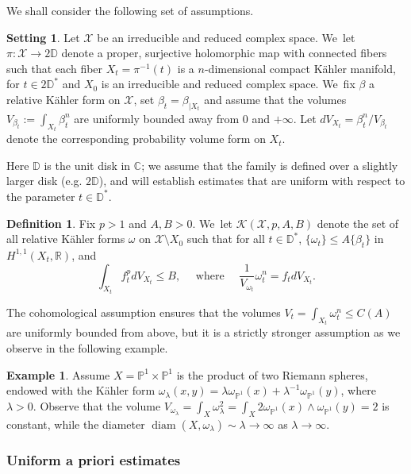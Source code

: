 \documentclass[JEP,XML,SOM,Unicode,published]{cedram}
\DeclareMathOperator{\diam}{diam}
\theoremstyle{definition}
\newtheorem{setting}[theorem]{Setting}
\newtheorem{defi}[theorem]{Definition}
\newtheorem{exa}[theorem]{Example}
\newcommand{\C}{\mathbb C}
\newcommand{\PP}{\mathbb P}
\newcommand{\R}{\mathbb R}
\begin{document}
We shall consider the following set of assumptions.

\begin{setting} \label{set}
Let $\mathcal{X}$ be an irreducible and reduced complex space. We~let $\pi:{\mathcal X} \rightarrow 2 \mathbb D$
denote a proper, surjective holomorphic map with connected fibers such that each fiber $X_t=\pi^{-1}(t)$ is a $n$-dimensional
compact Kähler manifold, for $t\in 2 \mathbb D^*$ and $X_0$ is an irreducible and reduced complex space. We~fix $\beta$ a relative Kähler form on $\mathcal{X}$, set $\beta_t=\beta_{|X_t}$ and assume that the volumes $V_{\beta_t}:=\int_{X_t} \beta_t^n$ are uniformly bounded away from 0 and $+ \infty $. Let $dV_{X_t}=\beta_t^n /V_{\beta_t}$ denote the corresponding probability volume form on $X_t$.
\end{setting}

Here $\mathbb D$ is the unit disk in $\C$; we assume that the family is defined over a slightly larger disk
(e.g. $2 \mathbb D$), and will establish estimates that are uniform with respect to the parameter $t \in \mathbb D^*$.

\begin{defi}
Fix $p>1$ and $A,B>0$. We~let ${\mathcal K}(\mathcal{X},p,A,B)$ denote the set of all relative Kähler forms $\omega$ on
$\mathcal{X}\setminus X_0$ such that for all $t \in \mathbb D^*$, $\{\omega_t\}\leq A\{\beta_t\}$ in $H^{1,1}(X_t,\R)$, and
\[
\int_{X_t} f_t^p dV_{X_t} \leq B,
\quad \text{ where } \quad
\frac{1}{V_{\omega_t}} \omega_t^n=f_t dV_{X_t}.
\]
\end{defi}

The cohomological assumption
ensures that the volumes $V_t=\int_{X_t} \omega_t^n \leq C(A)$ are uniformly bounded from above,
but it is a strictly stronger assumption as we observe in the following example.

\begin{exa} \label{exa:voldiam}
Assume ${X}=\PP^1 \times \PP^1$ is the product of two Riemann spheres, endowed with the
Kähler form $\omega_{\lambda}(x,y)=\lambda \omega_{\PP^1}(x)+\lambda^{-1} \omega_{\PP^1}(y)$,
where $\lambda>0$. Observe that the volume
$
V_{\omega_{\lambda}}=\int_X \omega_{\lambda}^2=\int_X 2 \omega_{\PP^1}(x) \wedge \omega_{\PP^1}(y)=2
$
is constant, while the diameter
$\diam(X,\omega_{\lambda}) \sim \lambda \rightarrow \infty$ as $\lambda \rightarrow \infty$.
\end{exa}

\subsubsection{Uniform a priori estimates}
\end{document}
